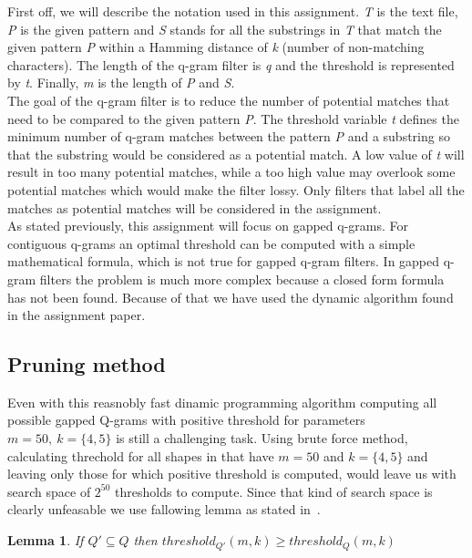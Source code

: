 \documentclass[paper=a4, fontsize=11pt]{scrartcl} %
\newtheorem{lemma}[theorem]{Lemma}
\numberwithin{equation}{section} %
\numberwithin{figure}{section} %
\numberwithin{table}{section} %
\begin{document}
First off, we will describe the notation used in this assignment. \textit{T} is the text file, \textit{P} is the given pattern and \textit{S} stands 
for all the substrings in \textit{T} that match the given pattern \textit{P} within a Hamming distance of \textit{k} (number of non-matching characters). 
The length of the q-gram filter is \textit{q} and the threshold is represented by \textit{t}. Finally, \textit{m} is the length of \textit{P} and \textit{S}. \\
The goal of the q-gram filter is to reduce the number of potential matches that need to be compared to the given pattern \textit{P}. 
The threshold variable \textit{t} defines the minimum number of q-gram matches between the pattern \textit{P} and 
a substring so that the substring would be considered as a potential match. A low value of \textit{t} will result in too many potential matches, 
while a too high value may overlook some potential matches which would make the filter lossy. Only filters that label all the matches as 
potential matches will be considered in the assignment.\\
As stated previously, this assignment will focus on gapped q-grams. For contiguous q-grams an optimal threshold can be computed with a
simple mathematical formula, which is not true for gapped q-gram filters. In gapped q-gram filters the problem is much more complex
because a closed form formula has not been found. Because of that we have used the dynamic algorithm found in the assignment paper.




\subsection{Pruning method}

Even with this reasnobly fast dinamic programming algorithm computing all possible gapped Q-grams with positive threshold for parameters $m=50,\ k=\{4,5\}$ is still a challenging task. Using brute force method, calculating threchold for all shapes in that have $m=50$ and $k=\{4,5\}$ and leaving only those for which positive threshold is computed, would leave us with search space of $2^{50}$ thresholds to compute. Since that kind of search space is clearly unfeasable we use fallowing lemma as
stated in~\cite{njihovPaper}. 

\begin{lemma}
    \label{subSetLemma}
    If $Q' \subseteq Q$ then $threshold_{Q'}(m,k) \geq threshold_{Q}(m,k)$
\end{lemma}
\end{document}
